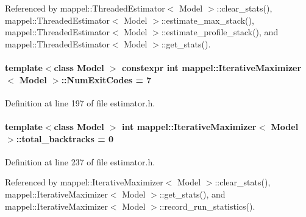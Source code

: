 Referenced by mappel\+::\+Threaded\+Estimator$<$ Model $>$\+::clear\+\_\+stats(), mappel\+::\+Threaded\+Estimator$<$ Model $>$\+::estimate\+\_\+max\+\_\+stack(), mappel\+::\+Threaded\+Estimator$<$ Model $>$\+::estimate\+\_\+profile\+\_\+stack(), and mappel\+::\+Threaded\+Estimator$<$ Model $>$\+::get\+\_\+stats().

\paragraph[{\texorpdfstring{Num\+Exit\+Codes}{NumExitCodes}}]{\setlength{\rightskip}{0pt plus 5cm}template$<$class Model $>$ constexpr int {\bf mappel\+::\+Iterative\+Maximizer}$<$ Model $>$\+::Num\+Exit\+Codes = 7\hspace{0.3cm}{\ttfamily [static]}}\hypertarget{classmappel_1_1IterativeMaximizer_a04888d87aa205d54e7cae5a97d1c1e75}{}\label{classmappel_1_1IterativeMaximizer_a04888d87aa205d54e7cae5a97d1c1e75}


Definition at line 197 of file estimator.\+h.

\paragraph[{\texorpdfstring{total\+\_\+backtracks}{total_backtracks}}]{\setlength{\rightskip}{0pt plus 5cm}template$<$class Model $>$ int {\bf mappel\+::\+Iterative\+Maximizer}$<$ Model $>$\+::total\+\_\+backtracks = 0\hspace{0.3cm}{\ttfamily [protected]}}\hypertarget{classmappel_1_1IterativeMaximizer_a752717a4e69ba7cd44a6167d0cbdb242}{}\label{classmappel_1_1IterativeMaximizer_a752717a4e69ba7cd44a6167d0cbdb242}


Definition at line 237 of file estimator.\+h.



Referenced by mappel\+::\+Iterative\+Maximizer$<$ Model $>$\+::clear\+\_\+stats(), mappel\+::\+Iterative\+Maximizer$<$ Model $>$\+::get\+\_\+stats(), and mappel\+::\+Iterative\+Maximizer$<$ Model $>$\+::record\+\_\+run\+\_\+statistics().

